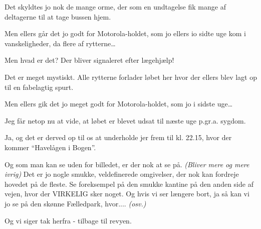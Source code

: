 \documentclass[10pt]{article}
\begin{document}
\begin{sketch}
 Det skyldtes jo nok de mange orme, der som en undtagelse fik mange
af deltagerne til at tage bussen hjem.

 Men ellers går det jo godt for Motorola-holdet, som jo ellers io
sidte uge kom i vanskeligheder, da flere af rytterne\ldots


 Men hvad er det? Der bliver signaleret efter lægehjælp!


 Det er meget mystiskt. Alle rytterne forlader løbet her hvor der
ellers blev lagt op til en fabelagtig spurt.

 Men ellers gik det jo meget godt for Motorola-holdet, som jo i
sidste uge\ldots

 Jeg får netop nu at vide, at løbet er blevet udsat til næste uge
p.gr.a. sygdom.


 Ja, og det er derved op til os at underholde jer frem til kl. 22.15,
hvor der kommer ``Havelågen i Bogen''.

 Og som man kan se uden for billedet, er der nok at se på. {\em
(Bliver mere og mere ivrig)} Det er jo nogle smukke, veldefinerede omgivelser,
der nok kan fordreje hovedet på de fleste. Se foreksempel på den smukke
kantine på den anden side af vejen, hvor der VIRKELIG sker noget. Og hvis vi
ser længere bort, ja så kan vi jo se på den skønne Fælledpark, hvor....{\em
(osv.)} 

 Og vi siger tak herfra - tilbage til revyen.

\end{sketch}
\end{document}

